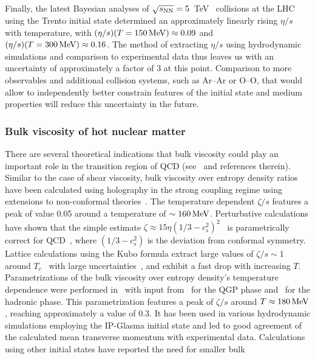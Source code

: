 Finally, the latest Bayesian analyses of $\sqrt{s_{\mathrm{NN}}}=5$~TeV \pbpb\ 
  collisions at the LHC using the Trento initial state determined an 
  approximately linearly rising $\eta/s$ with temperature, with 
  $(\eta/s)(T=150\,{\rm MeV})\approx 0.09$ and 
  $(\eta/s)(T=300\,{\rm MeV})\approx 0.16$.
The method of extracting $\eta/s$ using hydrodynamic simulations and comparison 
  to experimental data thus leaves us with an uncertainty of approximately 
  a factor of $3$ at this point. 
Comparison to more observables and additional collision systems, 
  such as Ar--Ar or O--O, that would allow to independently better constrain 
  features of the initial state and medium properties will reduce this 
  uncertainty in the future. 


\subsubsection{Bulk viscosity of hot nuclear matter}
There are several theoretical indications that bulk viscosity could play 
  an important role in the transition region of QCD (see~\cite{Ryu:2017qzn} 
  and references therein). 
Similar to the case of shear viscosity, bulk viscosity over entropy density 
  ratios have been calculated using holography in the strong coupling regime 
  using extensions to non-conformal theories~\cite{Buchel:2007mf,Finazzo:2014cna}. 
The temperature dependent $\zeta/s$ features a peak of value 0.05 around a 
  temperature of $\sim 160\,{\rm MeV}$. 
Perturbative calculations have shown that the simple estimate 
  $\zeta\approx 15 \eta(1/3-c_s^2)^2$~\cite{Horsley:1985dz} is parametrically 
  correct for QCD~\cite{Arnold:2006fz}, where $(1/3-c_s^2)$ is the deviation 
  from conformal symmetry. 
Lattice calculations using the Kubo formula extract large values of 
  $\zeta/s\sim 1$ around $T_c$~\cite{Karsch:2007jc,Meyer:2007dy} with 
  large uncertainties~\cite{Kharzeev:2007wb}, and exhibit a fast drop 
  with increasing $T$.
Parametrizations of the bulk viscosity over entropy density's temperature 
  dependence were performed in~\cite{Denicol:2009am} with input from~\cite{Karsch:2007jc} 
  for the QGP phase and~\cite{NoronhaHostler:2008ju} for the hadronic phase. 
This parametrization features a peak of $\zeta/s$ around $T\approx 180\,{\rm MeV}$, 
  reaching approximately a value of 0.3. 
It has been used in various hydrodynamic simulations employing the IP-Glasma 
  initial state and led to good agreement of the calculated mean transverse 
  momentum with experimental data. 
Calculations using other initial states have reported the need for smaller bulk 
